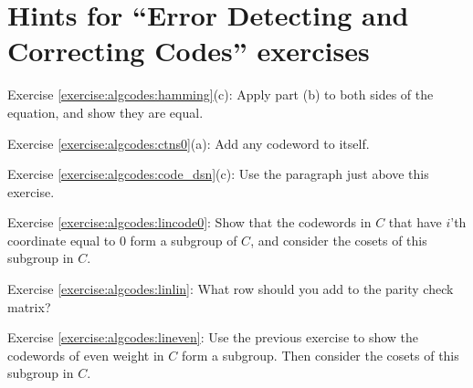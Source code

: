 \section{Hints for ``Error Detecting and Correcting Codes'' exercises}
\label{sec:ErrorAndCorrectionCode:Hints} 


Exercise \ref{exercise:algcodes:hamming}(c): Apply part (b) to both sides of the equation, and show they are equal.


\noindent Exercise \ref{exercise:algcodes:ctns0}(a): Add any codeword to itself.

\noindent Exercise \ref{exercise:algcodes:code_dsn}(c): Use the  paragraph just above this exercise.

\noindent Exercise \ref{exercise:algcodes:lincode0}: Show that the codewords in $C$ that have $i$'th coordinate equal to 0 form a subgroup of $C$, and consider the cosets of this subgroup in $C$.

\noindent Exercise \ref{exercise:algcodes:linlin}:  What row should you add to the parity check matrix?

\noindent Exercise \ref{exercise:algcodes:lineven}:  Use the previous exercise to show the codewords of even weight in $C$ form a subgroup. Then consider the cosets of this subgroup in $C$.
